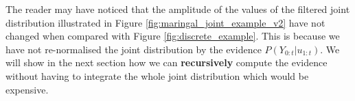 The reader may have noticed that the amplitude of the values of the filtered joint distribution illustrated in Figure \ref{fig:maringal_joint_example_v2} have not changed
when compared with Figure \ref{fig:discrete_example}. This is because we have not re-normalised the joint distribution by the evidence $P(Y_{0:t}|u_{1:t})$. We will show 
in the next section how we can \textbf{recursively} compute the evidence without having to integrate the whole joint distribution which would be 
expensive.



